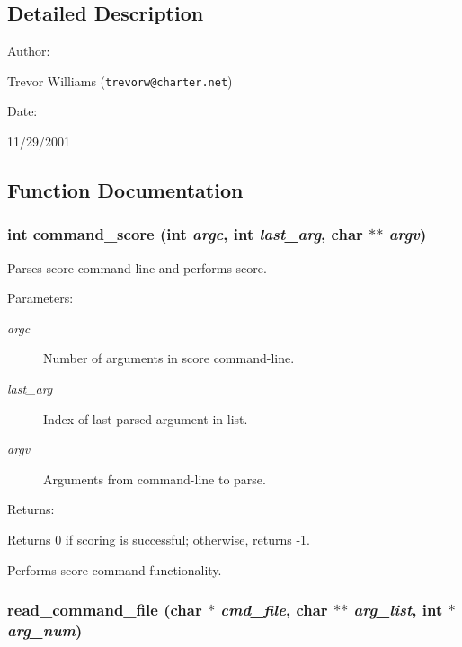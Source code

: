 \subsection{Detailed Description}


\begin{Desc}
\item[Author: ]\par
Trevor Williams ({\tt trevorw@charter.net}) \end{Desc}
\begin{Desc}
\item[Date: ]\par
11/29/2001\end{Desc}


\subsection{Function Documentation}
\subsubsection{\setlength{\rightskip}{0pt plus 5cm}int command\_\-score (int {\em argc}, int {\em last\_\-arg}, char $\ast$$\ast$ {\em argv})}\label{score_8c_a9}


Parses score command-line and performs score.

\begin{Desc}
\item[Parameters: ]\par
\begin{description}
\item[{\em 
argc}]Number of arguments in score command-line. \item[{\em 
last\_\-arg}]Index of last parsed argument in list. \item[{\em 
argv}]Arguments from command-line to parse.\end{description}
\end{Desc}
\begin{Desc}
\item[Returns: ]\par
Returns 0 if scoring is successful; otherwise, returns -1.\end{Desc}
Performs score command functionality. 
\subsubsection{ read\_\-command\_\-file (char $\ast$ {\em cmd\_\-file}, char $\ast$$\ast$ {\em arg\_\-list}, int $\ast$ {\em arg\_\-num})}\label{score_8c_a7}


